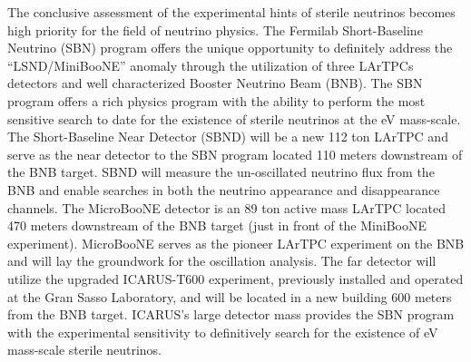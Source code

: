 \label{sec:IF_SBNintro}
The conclusive assessment of the experimental hints of sterile neutrinos becomes high priority for the field of neutrino physics. The Fermilab Short-Baseline Neutrino (SBN) program offers the unique opportunity to definitely address the ``LSND/MiniBooNE'' anomaly through the utilization of three LArTPCs detectors and well characterized Booster Neutrino Beam (BNB). The SBN program offers a rich physics program with the ability to perform the most sensitive search to date for the existence of sterile neutrinos at the eV mass-scale. The Short-Baseline Near Detector (SBND) will be a new 112 ton LArTPC and serve as the near detector to the SBN program located 110 meters downstream of the BNB target. SBND will measure the un-oscillated neutrino flux from the BNB and enable searches in both the neutrino appearance and disappearance channels. The MicroBooNE detector is an 89 ton active mass LArTPC located 470 meters downstream of the BNB target (just in front of the MiniBooNE experiment). MicroBooNE serves as the pioneer LArTPC experiment on the BNB and will lay the groundwork for the oscillation analysis. The far detector will utilize the upgraded ICARUS-T600 experiment, previously installed and operated at the Gran Sasso Laboratory, and will be located in a new building 600 meters from the BNB target. ICARUS's large detector mass provides the SBN program with the experimental sensitivity to definitively search for the existence of eV mass-scale sterile neutrinos.




